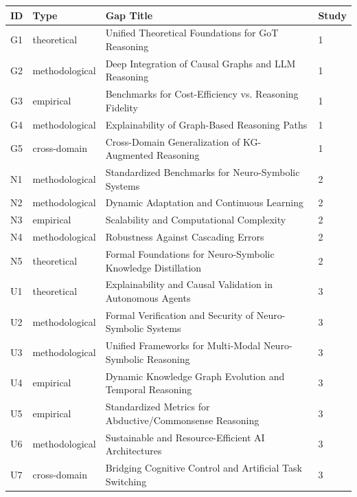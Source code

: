 \documentclass[11pt,a4paper]{article}
\begin{document}
\begin{tabular}{|l|l|}
\hline
ID & Type & Gap Title & Study \\
\hline
G1 & theoretical & Unified Theoretical Foundations for GoT Reasoning & 1 \\
\hline
G2 & methodological & Deep Integration of Causal Graphs and LLM Reasoning & 1 \\
\hline
G3 & empirical & Benchmarks for Cost-Efficiency vs. Reasoning Fidelity & 1 \\
\hline
G4 & methodological & Explainability of Graph-Based Reasoning Paths & 1 \\
\hline
G5 & cross-domain & Cross-Domain Generalization of KG-Augmented Reasoning & 1 \\
\hline
N1 & methodological & Standardized Benchmarks for Neuro-Symbolic Systems & 2 \\
\hline
N2 & methodological & Dynamic Adaptation and Continuous Learning & 2 \\
\hline
N3 & empirical & Scalability and Computational Complexity & 2 \\
\hline
N4 & methodological & Robustness Against Cascading Errors & 2 \\
\hline
N5 & theoretical & Formal Foundations for Neuro-Symbolic Knowledge Distillation & 2 \\
\hline
U1 & theoretical & Explainability and Causal Validation in Autonomous Agents & 3 \\
\hline
U2 & methodological & Formal Verification and Security of Neuro-Symbolic Systems & 3 \\
\hline
U3 & methodological & Unified Frameworks for Multi-Modal Neuro-Symbolic Reasoning & 3 \\
\hline
U4 & empirical & Dynamic Knowledge Graph Evolution and Temporal Reasoning & 3 \\
\hline
U5 & empirical & Standardized Metrics for Abductive/Commonsense Reasoning & 3 \\
\hline
U6 & methodological & Sustainable and Resource-Efficient AI Architectures & 3 \\
\hline
U7 & cross-domain & Bridging Cognitive Control and Artificial Task Switching & 3 \\
\hline
\end{tabular}
\end{document}
